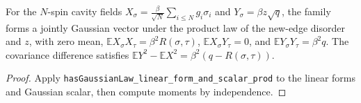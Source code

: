\begin{lemma}
\label{lem:sg-tal:cavity-N-fields}
  \leanok
{}
For the $N$-spin cavity fields $X_\sigma = \frac{\beta}{\sqrt{N}} \sum_{i \le N} g_i \sigma_i$ and $Y_\sigma = \beta z \sqrt{q}$,
the family forms a jointly Gaussian vector under the product law of the new-edge disorder and $z$, with zero mean,
$\mathbb E X_\sigma X_\tau = \beta^2 R(\sigma, \tau)$, $\mathbb E X_\sigma Y_\tau = 0$, and $\mathbb E Y_\sigma Y_\tau = \beta^2 q$.
The covariance difference satisfies $\mathbb E Y^2 - \mathbb E X^2 = \beta^2(q - R(\sigma, \tau))$.
\end{lemma}
\begin{proof}
  \leanok
Apply \texttt{hasGaussianLaw\_linear\_form\_and\_scalar\_prod} to the linear forms and Gaussian scalar, then compute moments
by independence.
\end{proof}

